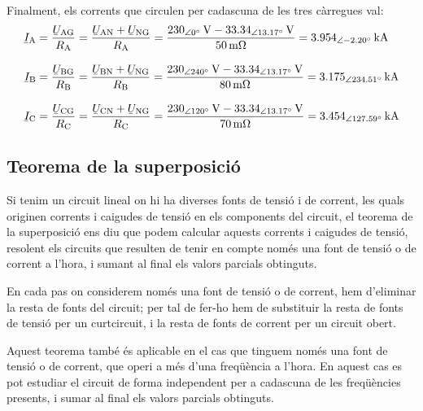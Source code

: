 \begin{exemple}
    Finalment, els corrents que circulen per cadascuna de les tres c\`{a}rregues val:
    \begin{align*}
    \cmplx{I}\ped{A} &= \frac{\cmplx{U}\ped{AG}}{R\ped{A}} = \frac{\cmplx{U}\ped{AN} + \cmplx{U}\ped{NG}}{R\ped{A}} = \frac{\SIpd{230}{0}{V}-\SIpd{33,34}{13,17}{V}}{\SI{50}{m\ohm}}
    = \SIpd{3,954}{-2,20}{kA}\\[2ex]
    \cmplx{I}\ped{B} &= \frac{\cmplx{U}\ped{BG}}{R\ped{B}} = \frac{\cmplx{U}\ped{BN} + \cmplx{U}\ped{NG}}{R\ped{B}} = \frac{\SIpd{230}{240}{V}-\SIpd{33,34}{13,17}{V}}{\SI{80}{m\ohm}}
    = \SIpd{3,175}{234,51}{kA}\\[2ex]
    \cmplx{I}\ped{C} &= \frac{\cmplx{U}\ped{CG}}{R\ped{C}} = \frac{\cmplx{U}\ped{CN} + \cmplx{U}\ped{NG}}{R\ped{C}} = \frac{\SIpd{230}{120}{V}-\SIpd{33,34}{13,17}{V}}{\SI{70}{m\ohm}}
    = \SIpd{3,454}{127,59}{kA}
    \end{align*}
\end{exemple}


\subsection{Teorema de la superposici\'{o}}

Si tenim un circuit lineal on hi ha diverses fonts de tensi\'{o} i  de
corrent, les quals originen corrents i caigudes de tensi\'{o} en els
components del circuit, el teorema de la superposici\'{o} ens diu que
podem calcular aquests corrents i caigudes de tensi\'{o}, resolent els
circuits que resulten de tenir en compte  nom\'{e}s una font de tensi\'{o} o
de corrent a l'hora, i sumant al final els valors parcials
obtinguts.

En cada pas on considerem nom\'{e}s una font de tensi\'{o} o de corrent, hem
d'eliminar la resta de fonts del circuit; per tal de fer-ho hem de
substituir la resta de fonts de tensi\'{o} per un curtcircuit, i la
resta de fonts de corrent per un circuit obert.

Aquest teorema tamb\'{e} \'{e}s aplicable en el cas que tinguem nom\'{e}s una
font de tensi\'{o} o de corrent, que operi a m\'{e}s d'una freq\"{u}\`{e}ncia a
l'hora. En aquest cas es pot estudiar el circuit de forma
independent per a cadascuna de les freq\"{u}\`{e}ncies presents, i sumar al
final els valors parcials obtinguts.

